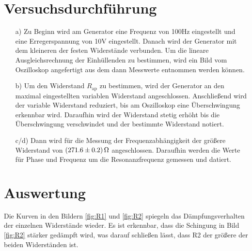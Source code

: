 
\section{Versuchsdurchführung}\justifying

 \begin{enumerate}

    \item[a)] \justifying Zu Beginn wird am Generator eine Frequenz von 100Hz 
    eingestellt und eine Erregerspannung von 10V eingestellt. Danach wird der 
    Generator mit dem kleineren der festen Widerstände verbunden.
    Um die lineare Ausgleichsrechnung der Einhüllenden zu bestimmen, wird
    ein Bild vom Oszilloskop angefertigt aus dem dann Messwerte entnommen werden
    können.

    \item[b)] \justifying Um den Widerstand $R_{\text{ap}}$ zu bestimmen, wird der Generator 
    an den maximal eingestellten variablen Widerstand angeschlossen. Anschließend wird 
    der variable Widerstand reduziert, bis am Oszilloskop eine Überschwingung erkennbar 
    wird. Daraufhin wird der Widerstand stetig erhöht bis die Überschwingung verschwindet 
    und der bestimmte Widerstand notiert.
  
    \item[c/d)] \justifying Dann wird für die Messung der Frequenzabhängigkeit
                          der größere Widerstand von $\SI{271.6\pm 0.2}{\ohm}$ angeschlossen.
                          Daraufhin werden die Werte für Phase und Frequenz um die 
                          Resonanzfrequenz gemessen und datiert.
 \end{enumerate}


\section{Auswertung}\justifying


  Die Kurven in den Bildern \ref{fig:R1} und \ref{fig:R2} spiegeln das Dämpfungsverhalten der einzelnen Widerstände wieder. 
  Es ist erkennbar, dass die Schingung in Bild \ref{fig:R2} stärker gedämpft wird, was darauf schließen lässt, dass R2 der 
  größere der beiden Widerständen ist.

